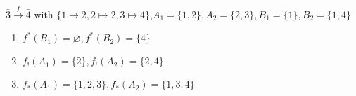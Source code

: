 $\bar 3 \xrightarrow{f} \bar 4$ with $\{1 \mapsto 2, 2 \mapsto 2, 3\mapsto 4\}$,$A_1 = \{1,2\}, A_2=\{2,3\}, B_1=\{1\}, B_2=\{1,4\}$
\begin{enumerate}
  \item $f^*(B_1)=\varnothing, f^*(B_2)=\{4\}$
  \item $f_!(A_1)=\{2\},f_!(A_2)=\{2,4\}$
  \item $f_*(A_1)=\{1,2,3\},f_*(A_2)=\{1,3,4\}$
\end{enumerate}
